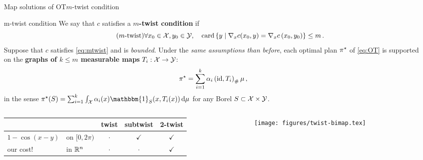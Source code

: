 \documentclass[9pt,xcolor={dvipsnames}]{beamer}
\begin{document}
\begin{frame}{Map solutions of OT}{$m$-twist condition}
    \begin{block}{m-twist condition }
        We say that $c$ satisfies a \textbf{$m$-twist condition} if
    \begin{equation}
        \tag{$m$-twist}
        \forall x_{0} \in \mathcal{X},y_{0} \in \mathcal{Y}, \quad \operatorname*{card}\left\{y \mid \nabla_x c(x_{0}, y)=\nabla_x c\left(x_{0}, y_{0}\right)\right\}\leq m\,.
        \label{eq:mtwist}
    \end{equation}
    Suppose that $c$ satisfies \cref{eq:mtwist} and is \emph{bounded}. Under the \emph{same assumptions than before}, each optimal plan $\pi^\star$ of \cref{eq:OT} is supported on the \textbf{graphs of $k\leq m$ measurable maps} $T_i:\mathcal{X}\to\mathcal{Y}$:
    $$\pi^\star=\sum_{i=1}^{k} \alpha_{i}\left(\operatorname{id}, T_i\right)_\# \mu\,,$$
    in the sense $\pi\opt(S)=\sum_{i=1}^k\int_\Xx\alpha_i(x)\mathbbm{1}_S(x,T_i(x))\dd\mu$ for any Borel $S\subset \mathcal{X}\times\mathcal{Y}$.
    \end{block}
    \begin{columns}
        \begin{column}{.7\textwidth}
                \begin{table}[h]
                    \raggedright
                    \begin{tabular}{ll|ccc}
                                           &                &  twist        & subtwist   & 2-twist \\\hline
                    $1-\cos(x-y)$          & on $[0,2\pi)$  &  $\cdot$      & $\checkmark$      & $\checkmark$\\
                    our cost!          & in $\mathbb{R}^n$  &  $\cdot$      & $\cdot$      & $\checkmark$
                    \end{tabular}
                \end{table}
        \end{column}
        \begin{column}{.3\textwidth}
            \begin{figure}
                \texttt{[image: figures/twist-bimap.tex]}
            \end{figure}
        \end{column}
    \end{columns}
\end{frame}
\end{document}
